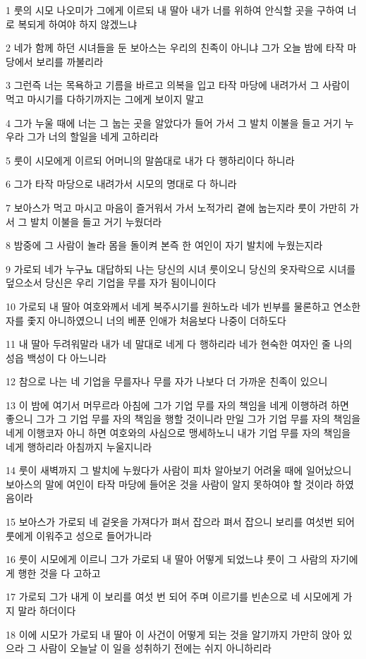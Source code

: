 \par 1 룻의 시모 나오미가 그에게 이르되 내 딸아 내가 너를 위하여 안식할 곳을 구하여 너로 복되게 하여야 하지 않겠느냐
\par 2 네가 함께 하던 시녀들을 둔 보아스는 우리의 친족이 아니냐 그가 오늘 밤에 타작 마당에서 보리를 까불리라
\par 3 그런즉 너는 목욕하고 기름을 바르고 의복을 입고 타작 마당에 내려가서 그 사람이 먹고 마시기를 다하기까지는 그에게 보이지 말고
\par 4 그가 누울 때에 너는 그 눕는 곳을 알았다가 들어 가서 그 발치 이불을 들고 거기 누우라 그가 너의 할일을 네게 고하리라
\par 5 룻이 시모에게 이르되 어머니의 말씀대로 내가 다 행하리이다 하니라
\par 6 그가 타작 마당으로 내려가서 시모의 명대로 다 하니라
\par 7 보아스가 먹고 마시고 마음이 즐거워서 가서 노적가리 곁에 눕는지라 룻이 가만히 가서 그 발치 이불을 들고 거기 누웠더라
\par 8 밤중에 그 사람이 놀라 몸을 돌이켜 본즉 한 여인이 자기 발치에 누웠는지라
\par 9 가로되 네가 누구뇨 대답하되 나는 당신의 시녀 룻이오니 당신의 옷자락으로 시녀를 덮으소서 당신은 우리 기업을 무를 자가 됨이니이다
\par 10 가로되 내 딸아 여호와께서 네게 복주시기를 원하노라 네가 빈부를 물론하고 연소한 자를 좇지 아니하였으니 너의 베푼 인애가 처음보다 나중이 더하도다
\par 11 내 딸아 두려워말라 내가 네 말대로 네게 다 행하리라 네가 현숙한 여자인 줄 나의 성읍 백성이 다 아느니라
\par 12 참으로 나는 네 기업을 무를자나 무를 자가 나보다 더 가까운 친족이 있으니
\par 13 이 밤에 여기서 머무르라 아침에 그가 기업 무를 자의 책임을 네게 이행하려 하면 좋으니 그가 그 기업 무를 자의 책임을 행할 것이니라 만일 그가 기업 무를 자의 책임을 네게 이행코자 아니 하면 여호와의 사심으로 맹세하노니 내가 기업 무를 자의 책임을 네게 행하리라 아침까지 누울지니라
\par 14 룻이 새벽까지 그 발치에 누웠다가 사람이 피차 알아보기 어려울 때에 일어났으니 보아스의 말에 여인이 타작 마당에 들어온 것을 사람이 알지 못하여야 할 것이라 하였음이라
\par 15 보아스가 가로되 네 겉옷을 가져다가 펴서 잡으라 펴서 잡으니 보리를 여섯번 되어 룻에게 이워주고 성으로 들어가니라
\par 16 룻이 시모에게 이르니 그가 가로되 내 딸아 어떻게 되었느냐 룻이 그 사람의 자기에게 행한 것을 다 고하고
\par 17 가로되 그가 내게 이 보리를 여섯 번 되어 주며 이르기를 빈손으로 네 시모에게 가지 말라 하더이다
\par 18 이에 시모가 가로되 내 딸아 이 사건이 어떻게 되는 것을 알기까지 가만히 앉아 있으라 그 사람이 오늘날 이 일을 성취하기 전에는 쉬지 아니하리라

